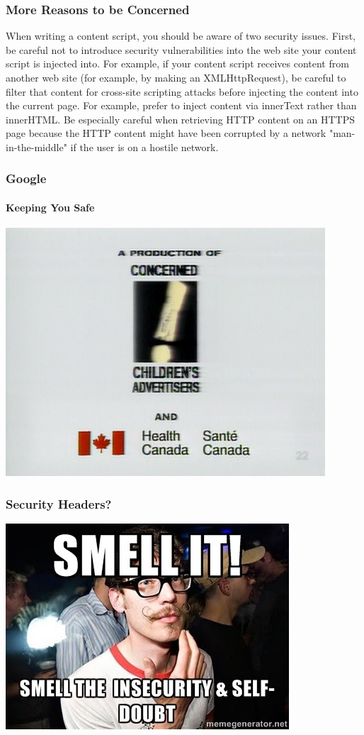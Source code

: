 \documentclass[aspectratio=169]{beamer}
\begin{document}
\begin{frame}
  \frametitle{More Reasons to be Concerned}
  \begin{center}
    \begin{tcolorbox}[title=Google Security Considerations Quote,colback=gray]
      When writing a content script, you should be aware of two security issues. First, be careful not to introduce security vulnerabilities into the web site your content script is injected into. For example, if your content script receives content from another web site (for example, by making an XMLHttpRequest), be careful to filter that content for cross-site scripting attacks before injecting the content into the current page. For example, prefer to inject content via innerText rather than innerHTML. Be especially careful when retrieving HTTP content on an HTTPS page because the HTTP content might have been corrupted by a network "man-in-the-middle" if the user is on a hostile network.\\
    \end{tcolorbox}
  \end{center}
\end{frame}
\begin{frame}
  \frametitle{Google}
  \framesubtitle{Keeping You Safe}
  \begin{center}
    \includegraphics[scale=0.5]{cca}
  \end{center}
\end{frame}
\begin{frame}
  \frametitle{Security Headers?}
  \begin{center}
    \includegraphics[scale=0.5]{insecurity}
  \end{center}
\end{frame}
\end{document}
